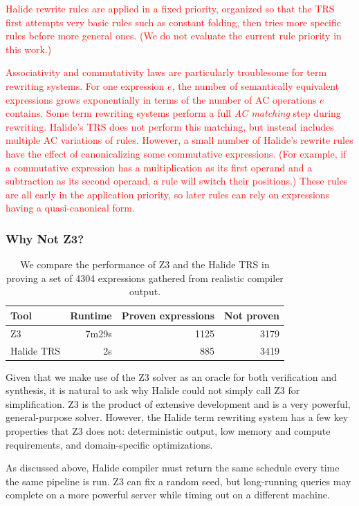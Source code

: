 \documentclass[acmsmall,review]{acmart}\settopmatter{printfolios=true,printccs=false,printacmref=false}
\newcommand{\modified}[1]{\textcolor{red}{{#1}}}
\begin{document}
\modified{Halide rewrite rules are applied in a fixed priority, organized so that the TRS 
first attempts very basic rules such as constant folding, then tries more specific 
rules before more general ones. (We do not evaluate the current rule priority in this work.)}

\modified{Associativity and commutativity laws are particularly troublesome for term rewriting systems. 
For one expression $e$, the number of semantically equivalent expressions grows 
exponentially in terms of the number of AC operations $e$ contains. Some term rewriting 
systems perform a full \emph{AC matching} step during rewriting. Halide's TRS does not
perform this matching, but instead
includes multiple AC variations of rules.
However, a small number of Halide's rewrite rules have the effect of canonicalizing some commutative
expressions. (For example, if a commutative expression has a multiplication as its 
first operand and a subtraction as its second operand, a rule will switch their positions.)
These rules are all early in the application priority, so later rules can rely on
expressions having a quasi-canonical form.}

\subsubsection{Why Not Z3?}
\begin{table}
\caption{We compare the performance of Z3 and the Halide TRS in proving a set of 4304 expressions gathered from realistic compiler output.}
\begin{tabular}{l|r|r|r}
Tool & Runtime & Proven expressions & Not proven \\
\hline
Z3 & 7m29s & 1125 & 3179 \\
Halide TRS & 2s & 885 & 3419 
\end{tabular}
\label{tab:simplifiervsz3}
\end{table}


Given that we make use of the Z3 solver as an oracle for both verification and synthesis, it is natural to ask why Halide could not simply call Z3 for simplification. Z3 is the product of extensive development and is a very powerful, general-purpose solver. However, the Halide term rewriting system has a few key properties that Z3 does not: deterministic output, low memory and compute requirements, and domain-specific optimizations.

As discussed above, Halide compiler must return the same schedule every time the same pipeline is run. Z3 can fix a random seed, but long-running queries may complete on a more powerful server while timing out on a different machine.
\end{document}
